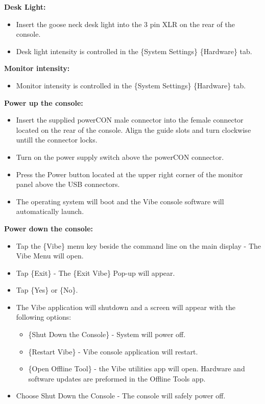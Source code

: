 \documentclass[
]{article}
\providecommand{\tightlist}{%
  \setlength{\itemsep}{0pt}\setlength{\parskip}{0pt}}
\begin{document}
\textbf{Desk Light:}

\begin{itemize}
\tightlist
\item
  Insert the goose neck desk light into the 3 pin XLR on the rear of the console.
\item
  {Desk light intensity is controlled in the \{System Settings\} \{Hardware\} tab.}
\end{itemize}

\textbf{Monitor intensity:}

\begin{itemize}
\tightlist
\item
  {Monitor intensity is controlled in the \{System Settings\} \{Hardware\} tab.}
\end{itemize}

\textbf{Power up the console:}

\begin{itemize}
\tightlist
\item
  Insert the supplied powerCON male connector into the female connector located on the rear of the console. Align the guide slots and turn clockwise untill the connector locks.
\item
  Turn on the power supply switch above the powerCON connector.
\item
  Press the Power button located at the upper right corner of the monitor panel above the USB connectors.
\item
  The operating system will boot and the Vibe console software will automatically launch.
\end{itemize}

\textbf{Power down the console:}

\begin{itemize}
\tightlist
\item
  Tap the \{Vibe\} menu key beside the command line on the main display - The Vibe Menu will open.
\item
  Tap \{Exit\} - The \{Exit Vibe\} Pop-up will appear.
\item
  Tap \{Yes\} or \{No\}.
\item
  The Vibe application will shutdown and a screen will appear with the following options:

  \begin{itemize}
  \tightlist
  \item
    {\{Shut Down the Console\} - System will power off.}
  \item
    {\{Restart Vibe\} - Vibe console application will restart.}
  \item
    {\{Open Offline Tool\} - the Vibe utilities app will open. Hardware and software updates are preformed in the Offline Tools app.}
  \end{itemize}
\item
  Choose Shut Down the Console - The console will safely power off.
\end{itemize}
\end{document}
